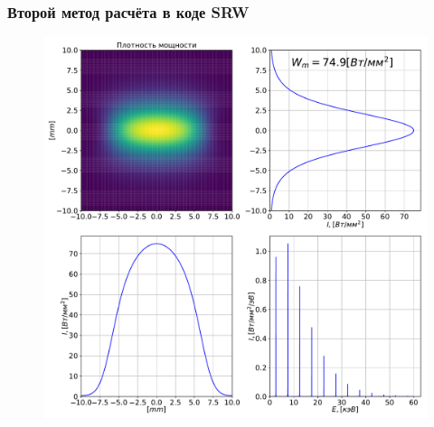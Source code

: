 \documentclass[14pt, hyperref = {colorlinks},xcolor=table ]{beamer}
\begin{document}
\small
\begin{frame}
\frametitle{Второй метод расчёта в коде SRW}\label{t1}
\vspace{-10pt}
\begin{figure}[h]
	\begin{minipage}[h]{0.65\linewidth}
		\vspace{-0pt}
		\includegraphics[width=1.0\linewidth]{pic/power_dens_1-2.pdf}
	\end{minipage}	
\end{figure}
\end{frame}
\end{document}
